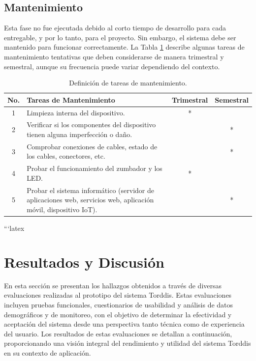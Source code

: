 \documentclass[a4paper,fleqn]{cas-sc}
\begin{document}
	\subsection{Mantenimiento}
	Esta fase no fue ejecutada debido al corto tiempo de desarrollo para cada entregable, y por lo tanto, para el proyecto. Sin embargo, el sistema debe ser mantenido para funcionar correctamente. La Tabla \ref{tab:maintenance-tasks} describe algunas tareas de mantenimiento tentativas que deben considerarse de manera trimestral y semestral, aunque su frecuencia puede variar dependiendo del contexto.
	
	\begin{table}[hbt!]
		\centering
		\caption{Definición de tareas de mantenimiento.}
		\label{tab:maintenance-tasks}
		\begin{tabularx}{\textwidth}{cXcc}
			\toprule
			\textbf{No.} & \textbf{Tareas de Mantenimiento} & \textbf{Trimestral} & \textbf{Semestral} \\
			\midrule
			1 & Limpieza interna del dispositivo. & * & \\
			2 & Verificar si los componentes del dispositivo tienen alguna imperfección o daño. & & * \\
			3 & Comprobar conexiones de cables, estado de los cables, conectores, etc. & & * \\
			4 & Probar el funcionamiento del zumbador y los LED. & * & \\
			5 & Probar el sistema informático (servidor de aplicaciones web, servicios web, aplicación móvil, dispositivo IoT). & & * \\
			\bottomrule
		\end{tabularx}
	\end{table}
	
	```latex
	\section{Resultados y Discusión}
	\label{seccion:Cinco}
	En esta sección se presentan los hallazgos obtenidos a través de diversas evaluaciones realizadas al prototipo del sistema Torddis. Estas evaluaciones incluyen pruebas funcionales, cuestionarios de usabilidad y análisis de datos demográficos y de monitoreo, con el objetivo de determinar la efectividad y aceptación del sistema desde una perspectiva tanto técnica como de experiencia del usuario. Los resultados de estas evaluaciones se detallan a continuación, proporcionando una visión integral del rendimiento y utilidad del sistema Torddis en su contexto de aplicación.
	
\end{document}
